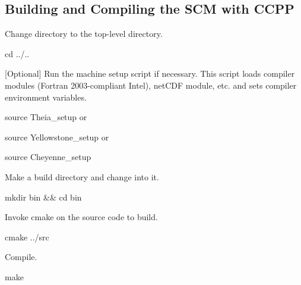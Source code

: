 \subsection*{Building and Compiling the S\+CM with C\+C\+PP}


\begin{DoxyEnumerate}
\item Change directory to the top-\/level directory.
\end{DoxyEnumerate}
\begin{DoxyItemize}
\item {\ttfamily cd ../..}
\end{DoxyItemize}
\begin{DoxyEnumerate}
\item \mbox{[}Optional\mbox{]} Run the machine setup script if necessary. This script loads compiler modules (Fortran 2003-\/compliant Intel), net\+C\+DF module, etc. and sets compiler environment variables.
\end{DoxyEnumerate}
\begin{DoxyItemize}
\item {\ttfamily source Theia\+\_\+setup} or
\item {\ttfamily source Yellowstone\+\_\+setup} or
\item {\ttfamily source Cheyenne\+\_\+setup}
\end{DoxyItemize}
\begin{DoxyEnumerate}
\item Make a build directory and change into it.
\end{DoxyEnumerate}
\begin{DoxyItemize}
\item {\ttfamily mkdir bin \&\& cd bin}
\end{DoxyItemize}
\begin{DoxyEnumerate}
\item Invoke cmake on the source code to build.
\end{DoxyEnumerate}
\begin{DoxyItemize}
\item {\ttfamily cmake ../src}
\end{DoxyItemize}
\begin{DoxyEnumerate}
\item Compile.
\end{DoxyEnumerate}
\begin{DoxyItemize}
\item {\ttfamily make}
\end{DoxyItemize}

